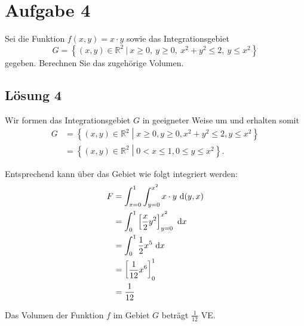 \documentclass[main.tex]{subfiles}
\begin{document}
\section{Aufgabe 4}
Sei die Funktion
$f(x,y) = x \cdot y$
sowie das Integrationsgebiet
\[
G = \left\{ (x,y) \in \mathbb{R}^2 \
| \ x \geq 0, \ y \geq 0, \ x^2 + y^2 \leq 2, \ y \leq x^2 \right\}
\]
gegeben. Berechnen Sie das zugehörige Volumen.

\subsection{Lösung 4}

Wir formen das Integrationsgebiet $G$ in geeigneter Weise um und erhalten somit
\begin{align*}
    G &= \left\{ (x,y) \in \mathbb{R}^2 \middle| x  \geq 0, y \geq 0, x^2 + y^2 \leq 2, y \leq x^2 \right\} \\
      &= \left\{ (x,y) \in \mathbb{R}^2 \middle| 0 < x \leq 1, 0 \leq y \leq x^2 \right\}.
\end{align*}

Entsprechend kann über das Gebiet wie folgt integriert werden:
\begin{align*}
    F &= \int_{x=0}^{1} \int_{y=0}^{x^2} x\cdot y ~\mathrm{d}(y,x) \\
      &= \int_{0}^{1} \left[ \frac{x}{2} y^2 \right]_{y=0}^{x^2} ~\mathrm{d}x \\
      &= \int_{0}^{1} \frac{1}{2} x^5 ~\mathrm{d}x \\
      &= \left[ \frac{1}{12} x^6 \right]_{0}^{1} \\
      &= \frac{1}{12} \\
\end{align*}

Das Volumen der Funktion $f$ im Gebiet $G$ beträgt $\frac{1}{12}$ VE.
\end{document}
